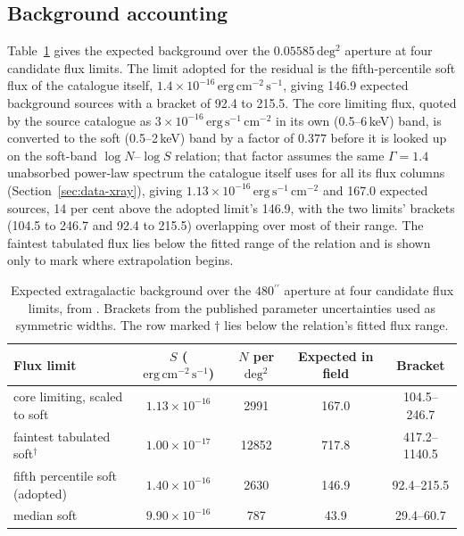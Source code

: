 \documentclass[11pt]{article}
\newcommand{\as}{\ensuremath{^{\prime\prime}}}
\begin{document}
\subsection{Background accounting}
\label{sec:results-agn}

Table~\ref{tab:agn} gives the expected background over the $0.05585\,\mathrm{deg^{2}}$ aperture at four candidate flux limits. The limit adopted for the residual is the fifth-percentile soft flux of the catalogue itself, $1.4\times10^{-16}\,\mathrm{erg\,cm^{-2}\,s^{-1}}$, giving 146.9 expected background sources with a bracket of 92.4 to 215.5. The core limiting flux, quoted by the source catalogue as $3\times10^{-16}\,\mathrm{erg\,s^{-1}\,cm^{-2}}$ in its own (0.5--6\,keV) band, is converted to the soft (0.5--2\,keV) band by a factor of $0.377$ before it is looked up on the soft-band $\log N$--$\log S$ relation; that factor assumes the same $\Gamma=1.4$ unabsorbed power-law spectrum the catalogue itself uses for all its flux columns (Section~\ref{sec:data-xray}), giving $1.13\times10^{-16}\,\mathrm{erg\,s^{-1}\,cm^{-2}}$ and 167.0 expected sources, 14 per cent above the adopted limit's 146.9, with the two limits' brackets (104.5 to 246.7 and 92.4 to 215.5) overlapping over most of their range. The faintest tabulated flux lies below the fitted range of the \citet{Moretti2003} relation and is shown only to mark where extrapolation begins.

\begin{table}[tbp]
\centering
\small
\caption{Expected extragalactic background over the $480\as$ aperture at four candidate flux limits, from \citet{Moretti2003}. Brackets from the published parameter uncertainties used as symmetric widths. The row marked $\dagger$ lies below the relation's fitted flux range.}
\label{tab:agn}
\begin{tabular}{lcccc}
\toprule
Flux limit & $S$ ($\mathrm{erg\,cm^{-2}\,s^{-1}}$) & $N$ per $\mathrm{deg^{2}}$ & Expected in field & Bracket \\
\midrule
core limiting, scaled to soft & $1.13\times10^{-16}$ & 2991  & 167.0 & 104.5--246.7 \\
faintest tabulated soft$^{\dagger}$ & $1.00\times10^{-17}$ & 12852 & 717.8 & 417.2--1140.5 \\
fifth percentile soft (adopted) & $1.40\times10^{-16}$ & 2630  & 146.9 & 92.4--215.5 \\
median soft & $9.90\times10^{-16}$ & 787   & 43.9  & 29.4--60.7 \\
\bottomrule
\end{tabular}
\end{table}
\end{document}
